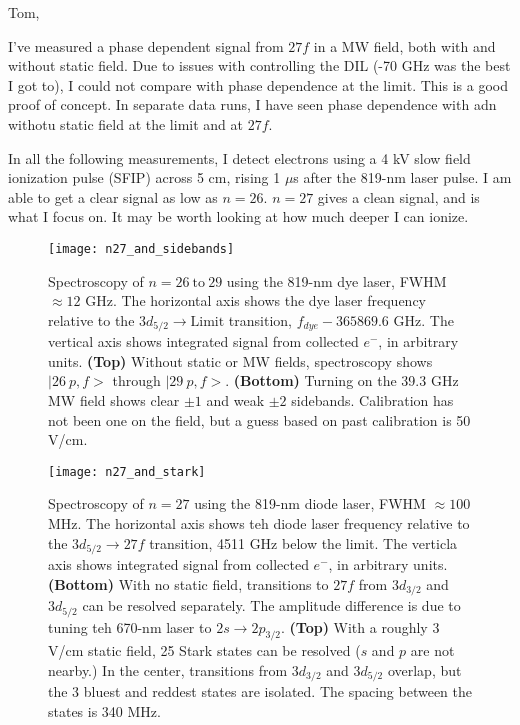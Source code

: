 \documentclass{article}
\begin{document}
Tom,

I've measured a phase dependent signal from $27f$ in a MW field, both with and without static field. Due to issues with controlling the DIL (-70 GHz was the best I got to), I could not compare with phase dependence at the limit. This is a good proof of concept. In separate data runs, I have seen phase dependence with adn withotu static field at the limit and at $27f$.


In all the following measurements, I detect electrons using a 4 kV slow field ionization pulse (SFIP) across 5 cm, rising 1 $\mu$s after the 819-nm laser pulse. I am able to get a clear signal as low as $n=26$. $n=27$ gives a clean signal, and is what I focus on. It may be worth looking at how much deeper I can ionize.


\begin{figure}
	\texttt{[image: n27\_and\_sidebands]}
	\caption{Spectroscopy of $n=26~\textrm{to}~29$ using the 819-nm dye laser, FWHM $\approx 12$ GHz. The horizontal axis shows the dye laser frequency relative to the $3d_{5/2} \rightarrow \textrm{Limit}$ transition, $f_{dye} - 365869.6$ GHz. The vertical axis shows integrated signal from collected $e^-$, in arbitrary units.
	\textbf{(Top)} Without static or MW fields, spectroscopy shows $|26~p,f{>}$ through $|29~p,f{>}$.
	\textbf{(Bottom)} Turning on the 39.3 GHz MW field shows clear $\pm 1$ and weak $\pm 2$ sidebands. Calibration has not been one on the field, but a guess based on past calibration is 50 V/cm.}
	\label{fig:n27mw}
\end{figure}


\begin{figure}
	\texttt{[image: n27\_and\_stark]}
	\caption{Spectroscopy of $n=27$ using the 819-nm diode laser, FWHM $\approx 100$ MHz. The horizontal axis shows teh diode laser frequency relative to the $3d_{5/2} \rightarrow 27f$ transition, 4511 GHz below the limit. The verticla axis shows integrated signal from collected $e^-$, in arbitrary units.
	\textbf{(Bottom)} With no static field, transitions to $27f$ from $3d_{3/2}$ and $3d_{5/2}$ can be resolved separately. The amplitude difference is due to tuning teh 670-nm laser to $2s \rightarrow 2p_{3/2}$.
	\textbf{(Top)} With a roughly 3 V/cm static field, 25 Stark states can be resolved ($s$ and $p$ are not nearby.) In the center, transitions from $3d_{3/2}$ and $3d_{5/2}$ overlap, but the 3 bluest and reddest states are isolated. The spacing between the states is 340 MHz.}
	\label{fig:n27s}
\end{figure}
\end{document}
